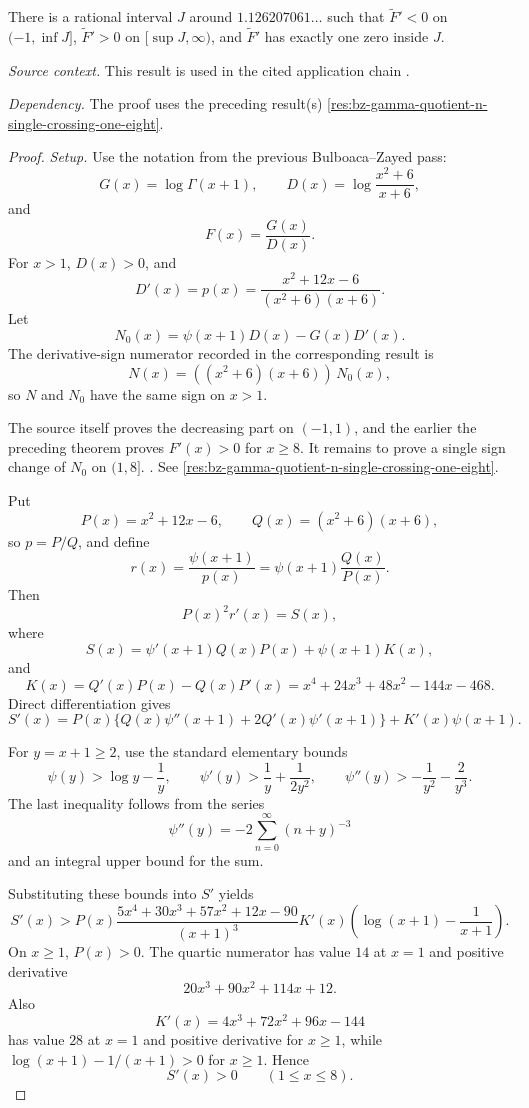 \begin{proposition}
\label{res:bz-gamma-quotient-critical-window-reduction}
There is a rational interval \(J\) around \(1.126207061\ldots\) such that \(\widetilde F'<0\) on \((-1,\inf J]\), \(\widetilde F'>0\) on \([\sup J,\infty)\), and \(\widetilde F'\) has exactly one zero inside \(J\).

\emph{Source context.} This result is used in the cited application chain \cite{app-app-0009-source}.

\emph{Dependency.} The proof uses the preceding result(s) \ref{res:bz-gamma-quotient-n-single-crossing-one-eight}.
\end{proposition}
\begin{proof}
\emph{Setup.}
Use the notation from the previous Bulboaca--Zayed pass:
\[
G(x)=\log\Gamma(x+1),\qquad
D(x)=\log\frac{x^2+6}{x+6},
\]
and
\[
F(x)=\frac{G(x)}{D(x)}.
\]
For \(x>1\), \(D(x)>0\), and
\[
D'(x)=p(x)=\frac{x^2+12x-6}{(x^2+6)(x+6)}.
\]
Let
\[
N_0(x)=\psi(x+1)D(x)-G(x)D'(x).
\]
The derivative-sign numerator recorded in
the corresponding result is
\[
N(x)=((x^2+6)(x+6))\,N_0(x),
\]
so \(N\) and \(N_0\) have the same sign on \(x>1\).

The source itself proves the decreasing part on \((-1,1)\), and the earlier
the preceding theorem proves \(F'(x)>0\) for
\(x\ge8\).  It remains to prove a single sign change of \(N_0\) on \((1,8]\). \cite{app-app-0009-source}. See \ref{res:bz-gamma-quotient-n-single-crossing-one-eight}.

Put
\[
P(x)=x^2+12x-6,\qquad Q(x)=(x^2+6)(x+6),
\]
so \(p=P/Q\), and define
\[
r(x)=\frac{\psi(x+1)}{p(x)}=\psi(x+1)\frac{Q(x)}{P(x)}.
\]
Then
\[
P(x)^2r'(x)=S(x),
\]
where
\[
S(x)=\psi'(x+1)Q(x)P(x)+\psi(x+1)K(x),
\]
and
\[
K(x)=Q'(x)P(x)-Q(x)P'(x)
=x^4+24x^3+48x^2-144x-468.
\]
Direct differentiation gives
\[
S'(x)=P(x)\{Q(x)\psi''(x+1)+2Q'(x)\psi'(x+1)\}+K'(x)\psi(x+1).
\]

For \(y=x+1\ge2\), use the standard elementary bounds
\[
\psi(y)>\log y-\frac1y,\qquad
\psi'(y)>\frac1y+\frac{1}{2y^2},\qquad
\psi''(y)>-\frac1{y^2}-\frac2{y^3}.
\]
The last inequality follows from the series
\[
\psi''(y)=-2\sum_{n=0}^{\infty}(n+y)^{-3}
\]
and an integral upper bound for the sum.

Substituting these bounds into \(S'\) yields
\[
S'(x)>
P(x)\frac{5x^4+30x^3+57x^2+12x-90}{(x+1)^3}
K'(x)\left(\log(x+1)-\frac1{x+1}\right).
\]
On \(x\ge1\), \(P(x)>0\).  The quartic numerator has value \(14\) at \(x=1\)
and positive derivative
\[
20x^3+90x^2+114x+12.
\]
Also
\[
K'(x)=4x^3+72x^2+96x-144
\]
has value \(28\) at \(x=1\) and positive derivative for \(x\ge1\), while
\(\log(x+1)-1/(x+1)>0\) for \(x\ge1\).  Hence
\[
S'(x)>0\qquad(1\le x\le8).
\]


\end{proof}
